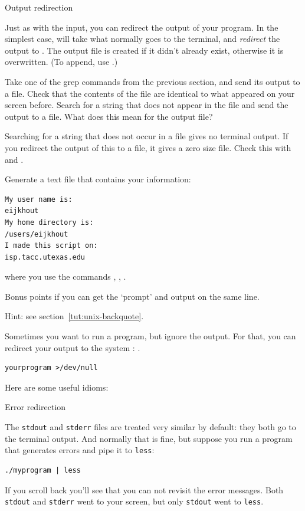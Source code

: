  {Output redirection}
\label{sec:output-redirect}

Just as with the input, you can redirect the output of your program.
In the simplest case,
will take what
normally goes to the terminal, and \emph{redirect}
the output to . The output
file is created if it didn't already exist, otherwise it is
overwritten. (To append, use .)

\begin{exercise}
  Take one of the grep commands from the previous section, and send
  its output to a file. Check that the contents of the file are
  identical to what appeared on your screen before. Search for a
  string that does not appear in the file and send the output to a
  file. What does this mean for the output file?
\end{exercise}
\begin{outcome}
  Searching for a string that does not occur in a file gives no
  terminal output. If you redirect the output of this  to a
  file, it gives a zero size file. Check this with  and .
\end{outcome}

\begin{exercise}
  Generate a text file that contains your information:
\begin{verbatim}
My user name is:
eijkhout
My home directory is:
/users/eijkhout
I made this script on:
isp.tacc.utexas.edu
\end{verbatim}
where you use the commands , , .

Bonus points if you can get the `prompt' and output on the same line.

Hint: see section~\ref{tut:unix-backquote}.
\end{exercise}

Sometimes you want to run a program, but ignore the output.
For that, you can redirect your output to the system
: .
\begin{lstlisting}
yourprogram >/dev/null
\end{lstlisting}
Here are some useful idioms:

 {Error redirection}
\label{sec:error-redirect}

The \lstinline{stdout} and \lstinline{stderr} files are treated very similar
by default: they both go to the terminal output.
And normally that is fine, but suppose you run a program that generates errors
and pipe it to \lstinline{less}:
\begin{lstlisting}
./myprogram | less
\end{lstlisting}
If you scroll back you'll see that you can not revisit the error messages.
Both  \lstinline{stdout} and \lstinline{stderr} went to your screen,
but only  \lstinline{stdout} went to \lstinline{less}.

